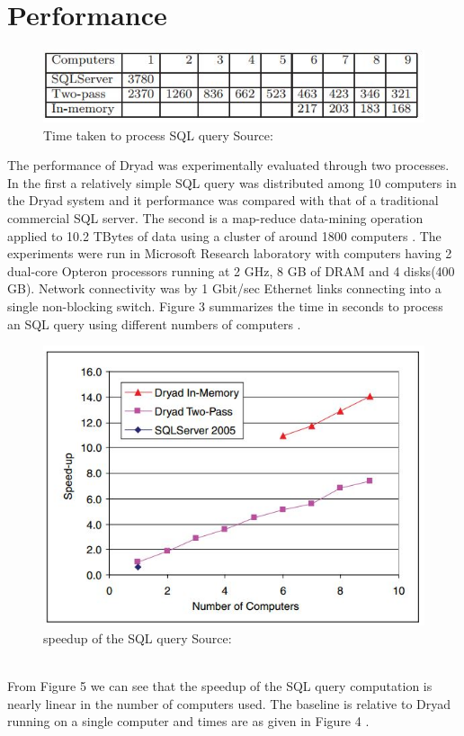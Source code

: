 \documentclass[9pt,twocolumn,twoside]{../../styles/osajnl}
\begin{document}
\section{Performance}
\begin{figure}[htbp]
\begin{center}
\centering
\includegraphics[width=\linewidth]{images/img4}
\caption{Time taken to process SQL query Source:\cite{DryadMSR4}}
\label{fig:false-color}
\end{center}
\end{figure}
The performance of Dryad was experimentally evaluated through two
processes. In the first a relatively simple SQL query was distributed
among 10 computers in the Dryad system and it performance was compared
with that of a traditional commercial SQL server. The second is a
map-reduce data-mining operation applied to 10.2 TBytes of data using
a cluster of around 1800 computers \cite{DryadMSR4}. The experiments
were run in Microsoft Research laboratory with computers having 2
dual-core Opteron processors running at 2 GHz, 8 GB of DRAM and 4
disks(400 GB). Network connectivity was by 1 Gbit/sec Ethernet links
connecting into a single non-blocking switch. Figure 3 summarizes the
time in seconds to process an SQL query using different numbers of
computers \cite{DryadMSR4}.
\begin{figure}[htbp]
\begin{center}
\centering
\includegraphics[width=\linewidth]{images/img5}
\caption{speedup of the SQL query Source:\cite{DryadMSR4}}
\label{fig:false-color}
\end{center}
\end{figure}
\\From Figure 5 we can see that the speedup of the SQL query
computation is nearly linear in the number of computers used. The
baseline is relative to Dryad running on a single computer and times
are as given in Figure 4 \cite{DryadMSR4}.
\end{document}
